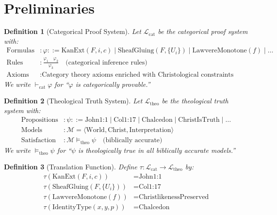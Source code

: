 \documentclass{article}
\newtheorem{definition}{Definition}
\begin{document}
\section{Preliminaries}

\begin{definition}[Categorical Proof System]
Let $\mathcal{L}_{\text{cat}}$ be the categorical proof system with:
\begin{align*}
\text{Formulas} &: \varphi ::= \text{KanExt}(F,i,c) \mid \text{SheafGluing}(F,\{U_i\}) \mid \text{LawvereMonotone}(f) \mid \ldots \\
\text{Rules} &: \frac{\varphi_1 \quad \varphi_2}{\varphi_3} \quad \text{(categorical inference rules)} \\
\text{Axioms} &: \text{Category theory axioms enriched with Christological constraints}
\end{align*}
We write $\vdash_{\text{cat}} \varphi$ for ``$\varphi$ is categorically provable.''
\end{definition}

\begin{definition}[Theological Truth System]
Let $\mathcal{L}_{\text{theo}}$ be the theological truth system with:
\begin{align*}
\text{Propositions} &: \psi ::= \text{John1:1} \mid \text{Col1:17} \mid \text{Chalcedon} \mid \text{ChristIsTruth} \mid \ldots \\
\text{Models} &: \mathcal{M} = \langle \text{World}, \text{Christ}, \text{Interpretation} \rangle \\
\text{Satisfaction} &: \mathcal{M} \models_{\text{theo}} \psi \quad \text{(biblically accurate)}
\end{align*}
We write $\models_{\text{theo}} \psi$ for ``$\psi$ is theologically true in all biblically accurate models.''
\end{definition}

\begin{definition}[Translation Function]
Define $\tau: \mathcal{L}_{\text{cat}} \to \mathcal{L}_{\text{theo}}$ by:
\begin{align*}
\tau(\text{KanExt}(F,i,c)) &= \text{John1:1} \\
\tau(\text{SheafGluing}(F,\{U_i\})) &= \text{Col1:17} \\
\tau(\text{LawvereMonotone}(f)) &= \text{ChristlikenessPreserved} \\
\tau(\text{IdentityType}(x,y,p)) &= \text{Chalcedon}
\end{align*}
\end{definition}
\end{document}
